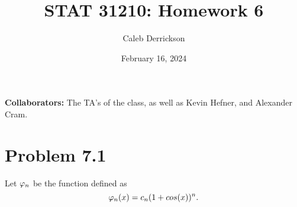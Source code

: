 

\title{STAT 31210: Homework 6}
\author{Caleb Derrickson}
\date{February 16, 2024}


\onehalfspacing
\maketitle
\allowdisplaybreaks
{\color{cit}\vspace{2mm}\noindent\textbf{Collaborators:}} The TA's of the class, as well as Kevin Hefner, and Alexander Cram.

\tableofcontents



\newpage
\section{Problem 7.1}
Let $\varphi_n$ be the function defined as
\[\varphi_n(x) = c_n(1 + cos(x))^n.\]

